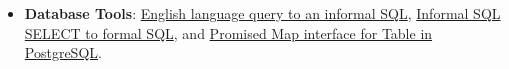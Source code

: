 \begin{itemize}[noitemsep, leftmargin=*]
  \item \textbf{Database Tools}:
    \href{https://github.com/nodef/pg-english}{English language query to an informal SQL},
    \href{https://github.com/nodef/pg-slang}{Informal SQL SELECT to formal SQL}, and
    \href{https://github.com/nodef/map-pg}{Promised Map interface for Table in PostgreSQL}.
\end{itemize}

